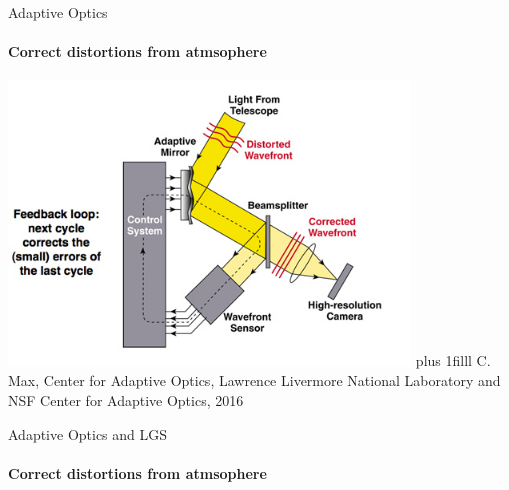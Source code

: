 \documentclass{beamer}
\newcommand{\btVFill}{\vskip0pt plus 1filll}
\begin{document}
\begin{frame}{Adaptive Optics}
  \framesubtitle{Correct distortions from atmsophere}
		\vspace{-.5cm}
		\center
		\includegraphics[width=0.8\textwidth]{Images/AOfigure.jpg}
		\btVFill
		{\tiny C. Max, Center for Adaptive Optics, Lawrence Livermore National Laboratory and NSF Center for Adaptive Optics, 2016}
\end{frame}

\begin{frame}{Adaptive Optics and LGS}
  \framesubtitle{Correct distortions from atmsophere}
  \center
  \vspace{-1.6cm}
\end{frame}
\end{document}
